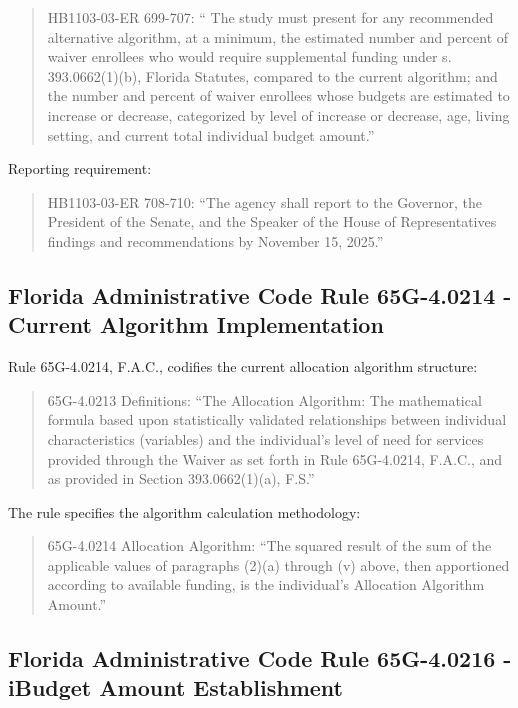 %
\begin{quote}
HB1103-03-ER 699-707: ``
The study must present for any recommended alternative algorithm, at a minimum, the estimated number and percent of waiver enrollees who would  require supplemental funding under s. 393.0662(1)(b), Florida Statutes, compared to the current algorithm; and the number and percent of waiver enrollees whose budgets are estimated to increase or decrease, categorized by level of increase or decrease, age, living setting, and current total individual budget amount.''
\end{quote}
%
Reporting requirement:
%
\begin{quote}
HB1103-03-ER 708-710: ``The agency shall report to the Governor, the President of the Senate, and the Speaker of the House of Representatives findings and recommendations by November 15, 2025.''
\end{quote}

\subsection{Florida Administrative Code Rule 65G-4.0214 - Current Algorithm Implementation}

Rule 65G-4.0214, F.A.C., codifies the current allocation algorithm structure:

\begin{quote}
65G-4.0213 Definitions: ``The Allocation Algorithm: The mathematical formula based upon statistically validated relationships between individual characteristics (variables) and the individual's level of need for services provided through the Waiver as set forth in Rule 65G-4.0214, F.A.C., and as provided in Section 393.0662(1)(a), F.S.''
\end{quote}
%
The rule specifies the algorithm calculation methodology:
%
\begin{quote}
65G-4.0214 Allocation Algorithm: ``The squared result of the sum of the applicable values of paragraphs (2)(a) through (v) above, then apportioned according to available funding, is the individual's Allocation Algorithm Amount.''
\end{quote}

\subsection{Florida Administrative Code Rule 65G-4.0216 - iBudget Amount Establishment}


